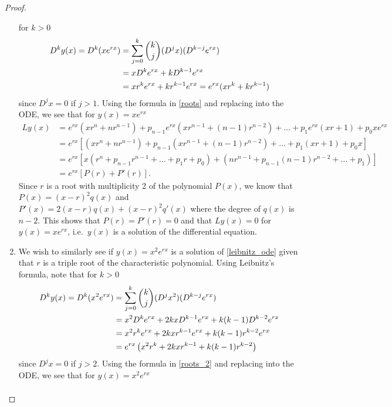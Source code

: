 \documentclass[12pt]{article}
\theoremstyle{definition}
\begin{document}
\begin{proof}
\begin{enumerate}
      for $k > 0$
      \begin{align}\label{roots}
        D^k y(x) = D^k(xe^{rx}) &= \sum_{j=0}^k \binom{k}{j} (D^{j}x)(D^{k-j}e^{rx}) \notag \\
        &= x D^{k} e^{rx} + k D^{k-1}e^{rx} \notag \\
        &= x r^k e^{rx} + k r^{k-1}e^{rx} = e^{rx} (xr^k + kr^{k-1})
      \end{align}
      since $D^j x = 0$ if $j > 1$. Using the formula in \eqref{roots}
      and replacing into the ODE, we see that for $y(x) = xe^{rx}$
      \begin{align*}
        Ly(x) &= e^{rx}(xr^n + nr^{n-1}) + p_{n-1}e^{rx}(xr^{n-1} + (n-1)r^{n-2}) + \dots + p_1 e^{rx}(xr+1) + p_0 xe^{rx} \\
        &= e^{rx}\left[(xr^n + nr^{n-1}) + p_{n-1}(xr^{n-1} + (n-1)r^{n-2}) + \dots + p_1 (xr+1) + p_0 x\right] \\
        &= e^{rx}\left[x(r^n + p_{n-1}r^{n-1} +\dots +p_1r + p_0) + (nr^{n-1} + p_{n-1}(n-1)r^{n-2} + \dots + p_1)\right] \\
        &= e^{rx}\left[P(r) + P'(r)\right].
      \end{align*}
      Since $r$ is a root with multiplicity 2 of the polynomial $P(x)$, we
      know that $P(x) = (x-r)^2q(x)$   and $P'(x) = 2(x-r)q(x) + (x-r)^2q'(x)$
      where the degree of $q(x)$ is $n-2$.
      This shows that $P(r) = P'(r) = 0$ and that $Ly(x) = 0$ for $y(x) = xe^{rx}$, i.e.\
      $y(x)$ is a solution of the differential equation.
    \item We wish to similarly see if $y(x) = x^2 e^{rx}$ is a solution of \eqref{leibnitz_ode} given
      that $r$ is a triple root of the characteristic polynomial. Using Leibnitz's formula, note that
      for $k > 0$
      \begin{align}\label{roots_2}
        D^k y(x) = D^k(x^2e^{rx}) &= \sum_{j=0}^k \binom{k}{j} (D^{j}x^2)(D^{k-j}e^{rx}) \notag \\
        &= x^2 D^{k} e^{rx} + 2kx D^{k-1}e^{rx} + k(k-1)D^{k-2}e^{rx}  \notag \\
        &= x^2 r^k e^{rx} + 2kx r^{k-1}e^{rx} + k(k-1) r^{k-2} e^{rx} \notag \\
        &= e^{rx} \left(x^2r^k + 2kxr^{k-1} + k(k-1) r^{k-2}\right)
      \end{align}
      since $D^j x = 0$ if $j > 2$. Using the formula in \eqref{roots_2}
      and replacing into the ODE, we see that for $y(x) = x^2e^{rx}$
      \begin{align*}

\end{align*}
\end{enumerate}
\end{proof}
\end{document}
